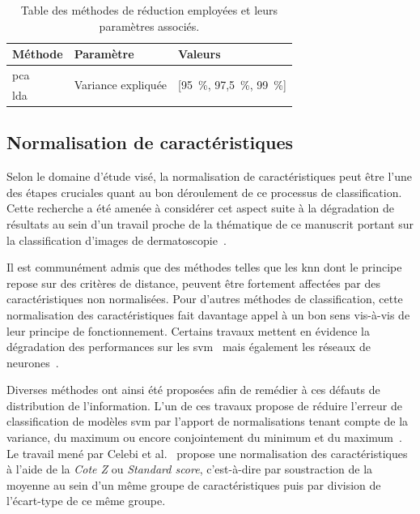 \begin{table}[H]
    \centering
    \begin{tabular}{lll}
        \toprule
        \textbf{Méthode}       & \textbf{Paramètre}                 & \textbf{Valeurs}                      \\ \midrule
        \gls{pca}              & \multirow{2}{*}{Variance expliquée}& \multirow{2}{*}{[95~\%, 97,5~\%, 99~\%]} \\ \cline{1-1}
        \gls{lda}              &                                    &                                       \\ 
        \bottomrule
    \end{tabular}
    \caption{Table des méthodes de réduction employées et leurs paramètres associés.}
    \label{tab:summary_reduction_methods}
\end{table}\par

\subsection{Normalisation de caractéristiques}
\label{subsec:features_normalisation}
Selon le domaine d'étude visé, la normalisation de caractéristiques peut être l'une des étapes cruciales quant au bon déroulement de ce processus de classification. Cette recherche a été amenée à considérer cet aspect suite à la dégradation de résultats au sein d'un travail proche de la thématique de ce manuscrit portant sur la classification d'images de dermatoscopie~\cite{Celebi2007}.\par

Il est communément admis que des méthodes telles que les \gls{knn} dont le principe repose sur des critères de distance, peuvent être fortement affectées par des caractéristiques non normalisées. Pour d'autres méthodes de classification, cette normalisation des caractéristiques fait davantage appel à un bon sens vis-à-vis de leur principe de fonctionnement. Certains travaux mettent en évidence la dégradation des performances sur les \gls{svm}~\cite{Juszczak2002} mais également les réseaux de neurones~\cite{Celebi2007}.\par

Diverses méthodes ont ainsi été proposées afin de remédier à ces défauts de distribution de l'information. L'un de ces travaux propose de réduire l'erreur de classification de modèles \gls{svm} par l'apport de normalisations tenant compte de la variance, du maximum ou encore conjointement du minimum et du maximum~\cite{Juszczak2002}. Le travail mené par Celebi et al.~\cite{Celebi2007} propose une normalisation des caractéristiques à l'aide de la \textit{Cote Z} ou \textit{Standard score}, c’est-à-dire par soustraction de la moyenne au sein d'un même groupe de caractéristiques puis par division de l'écart-type de ce même groupe.\par

